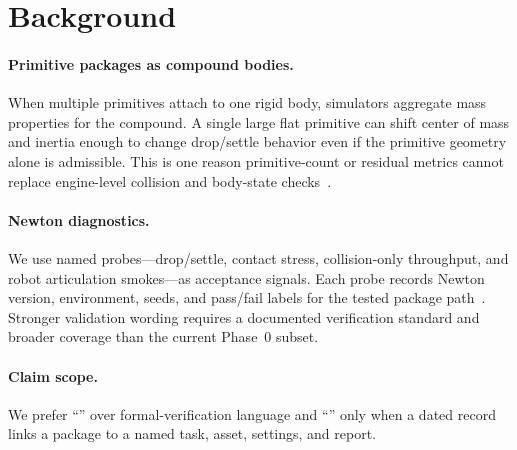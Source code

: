 \section{Background}
\label{sec:background}

\paragraph{Primitive packages as compound bodies.}
When multiple primitives attach to one rigid body, simulators aggregate mass properties for the compound.
A single large flat primitive can shift center of mass and inertia enough to change drop/settle behavior even if the primitive geometry alone is admissible.
This is one reason primitive-count or residual metrics cannot replace engine-level collision and body-state checks~\cite{ericson2004}.

\paragraph{Newton diagnostics.}
We use named probes---drop/settle, contact stress, collision-only throughput, and robot articulation smokes---as acceptance signals.
Each probe records Newton version, environment, seeds, and pass/fail labels for the tested package path~\cite{newton2026}.
Stronger validation wording requires a documented verification standard and broader coverage than the current Phase~0 subset.

\paragraph{Claim scope.}
We prefer ``\checker{}'' over formal-verification language and ``\simchecked{}'' only when a dated record links a package to a named task, asset, settings, and report.
